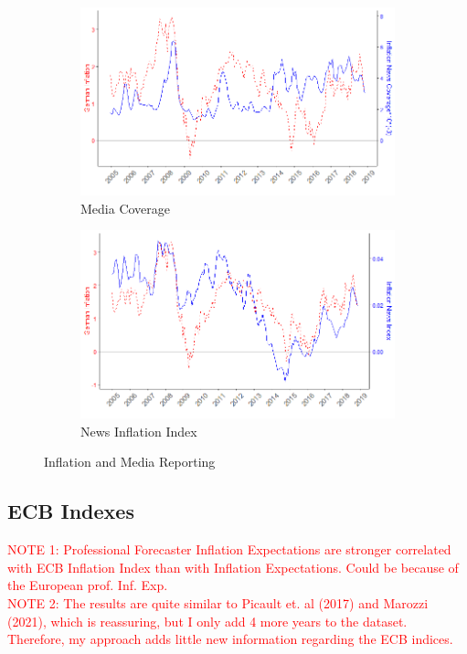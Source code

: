 \documentclass[review]{elsarticle}
\begin{document}
   \begin{figure}[h!]
    \centering
\begin{subfigure}{6cm}
    \includegraphics{Inflation_Count.png}
    \caption{Media Coverage}
    \label{10}
\end{subfigure}
\hfil
\begin{subfigure}{6cm}
    \includegraphics{Inflation_Sentiment_Direction.png}
    \caption{News Inflation Index}
    \label{100}
\end{subfigure}
\caption{Inflation and Media Reporting}
\label{fig:News Index}
    \end{figure}

\newpage    

\subsection{ECB Indexes}\label{sec:ECB Indexes}

\textcolor{red}{NOTE 1: Professional Forecaster Inflation Expectations are stronger correlated with ECB Inflation Index than with Inflation Expectations. Could be because of the European prof. Inf. Exp.}
\\
\textcolor{red}{NOTE 2: The results are quite similar to Picault et. al (2017) and Marozzi (2021), which is reassuring, but I only add 4 more years to the dataset. Therefore, my approach adds little new information regarding the ECB indices.}
\end{document}
